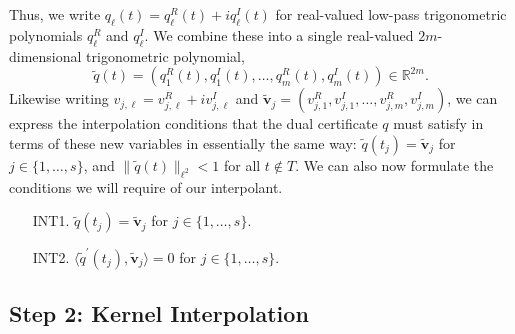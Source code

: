 \documentclass[11pt]{article}
\newcommand{\ra}{\rangle}
\newcommand{\la}{\langle}
\newcommand{\RR}{\mathbb{R}}
\newcommand{\bv}{\bm v}
\begin{document}
Thus, we write $q_\ell(t) = q_\ell^R(t) + iq_\ell^I(t)$ for real-valued low-pass trigonometric polynomials $q_\ell^R$ and $q_\ell^I$.
We combine these into a single real-valued $2m$-dimensional trigonometric polynomial,
\begin{equation}
    \tilde{q}(t) = (q_1^R(t), q_1^I(t), \dots, q_m^R(t), q_m^I(t)) \in \RR^{2m}.
\end{equation}
Likewise writing $v_{j, \ell} = v_{j, \ell}^R + iv_{j, \ell}^I$ and $\tilde{\bv}_j = (v_{j, 1}^R, v_{j, 1}^I, \dots, v_{j, m}^R, v_{j, m}^I)$, we can express the interpolation conditions that the dual certificate $q$ must satisfy in terms of these new variables in essentially the same way: $\tilde{q}(t_j) = \tilde{\bv}_j$ for $j \in \{1, \dots, s\}$, and $\|\tilde{q}(t)\|_{\ell^2} < 1$ for all $t \notin T$.
We can also now formulate the conditions we will require of our interpolant.
\begin{enumerate}[leftmargin=1.8cm]
\item[\textsf{INT1}.] $\tilde{q}(t_j) = \tilde{\bv}_j$ for $j \in \{1, \dots, s\}$.
\item[\textsf{INT2}.] $\la \tilde{q}^\prime(t_j), \tilde{\bv}_j \ra = 0$ for $j \in \{1, \dots, s\}$.
\end{enumerate}

\subsection{Step 2: Kernel Interpolation}
\end{document}
